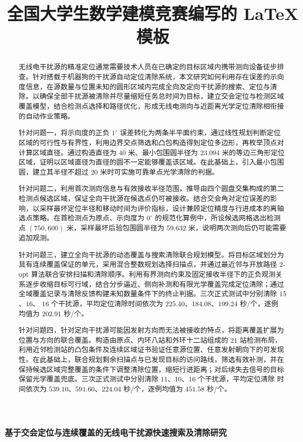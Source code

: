\documentclass[withoutpreface,bwprint]{cumcmthesis} %
\title{全国大学生数学建模竞赛编写的 \LaTeX{} 模板}
\begin{document}
\begingroup
\setlength{\emergencystretch}{2em}
\renewcommand{\thesubsection}{\texorpdfstring{\arabic{section}\thinspace.\thinspace\arabic{subsection}}{\arabic{section}.\arabic{subsection}}}
\renewcommand{\thesubsubsection}{\texorpdfstring{\thesubsection\thinspace.\thinspace\arabic{subsubsection}}{\arabic{section}.\arabic{subsection}.\arabic{subsubsection}}}
\begin{center}
{\heiti{}\bfseries 基于交会定位与连续覆盖的无线电干扰源快速搜索及清除研究\par}
\end{center}
\vspace{0.5em}
\begin{abstract}
无线电干扰源的精准定位通常需要技术人员在已确定的目标区域内携带测向设备徒步排查。针对搭载于机器狗的干扰源自动定位清除系统，本文研究如何利用存在误差的示向度信息，在源数量与位置未知的圆形区域内完成全向及定向干扰源的搜索、定位与清除。以确保全部干扰源被清除并尽量缩短任务总时间为目标，建立交会定位与检测区域覆盖模型，结合检测点选择和路径优化，形成无线电测向与近距离光学定位清除相衔接的自动作业策略。

针对问题一，将示向度的正负 $1^\circ$ 误差转化为两条半平面约束，通过线性规划判断定位区域的可行性与有界性，利用边界交点筛选和凸包构造得到定位多边形，再枚举顶点对计算区域直径。通过构造直径为 $40$ 米、最小包围圆半径为 $23.094$ 米的等边三角形定位区域，证明以区域直径为直径的圆不一定能够覆盖该区域。在此基础上，引入最小包围圆，建立其半径不超过 $20$ 米时可实施可靠单点光学清除的判据。

针对问题二，利用首次测向信息与有效接收半径范围，推导由四个圆盘交集构成的第二检测点候选区域，保证全向干扰源在候选点仍可被接收。结合交会角对定位误差的影响，以采样最坏定位半径和移动时间为评价指标，设计兼顾定位精度与行进成本的离轴选点策略。在首检测点为原点、示向度为 $0^\circ$ 的规范化算例中，所设候选网格选出检测点 $(750,600)$ 米，采样最坏后验包围圆半径为 $59.632$ 米，说明两次测向后仍可能需要追加观测。

针对问题三，建立全向干扰源的动态覆盖与搜索清除联合规划模型。将目标区域划分为具有连续覆盖保证的单元，采用混合整数规划选择扫描点，并通过最近邻与开放路径 2-opt 算法联合安排扫描和清除顺序。利用有界测向约束及固定接收半径下的正负观测关系逐步收缩目标可行域，结合分步逼近、侧向补测和有限光学覆盖完成定位清除；通过全域覆盖记录与清除反馈构建未知数量条件下的终止判据。三次正式测试中分别清除 $15$、$16$、
$16$ 个干扰源，平均定位清除时间依次为 $225.40$、$184.08$、$199.24$ 秒/个，逐例
均值为 $202.91$ 秒/个。

针对问题四，针对定向干扰源可能因发射方向而无法被接收的特点，将距离覆盖扩展为位置与方向的联合覆盖。构造由原点、内环八站和外环十二站组成的 $21$ 站检测布局，利用近邻检测站的凸包条件及连续区域证书验证任意源位置、任意发射朝向下的可发现性。在此基础上，联合规划剩余扫描点与已发现目标的访问路线，筛选有效补测，并在保持候选区域完整覆盖的条件下调整清除位置，缩短行进距离；对后续失去信号的目标保留光学覆盖兜底。三次正式测试中分别清除 $11$、$10$、$16$ 个干扰源，平均定位清除
时间依次为 $539.10$、$591.60$、$224.04$ 秒/个，逐例均值为 $451.58$ 秒/个。
\end{abstract}
\end{document}
